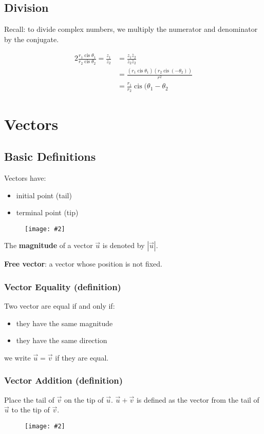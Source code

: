 \documentclass{article}
\newcommand{\diagram}[2][0.5]{
	\begin{figure}[H]
		\centering
		\texttt{[image: \#2]}
	\end{figure}
	}
\DeclareMathOperator\cis{cis}
\theoremstyle{definition}
\numberwithin{equation}{section}
\begin{document}
\subsection{Division}
Recall: to divide complex numbers, we multiply the numerator and denominator by the conjugate.

\begin{alignat*}{2}{}
	\frac{r_1 \cis \theta_1}{r_2 \cis \theta_2} = \frac{z_1}{z_2} &= \frac{z_1 \overline{z}_2}{z_2\overline{z}_2} \\
	&= \frac{(r_1\cis\theta_1)(r_2\cis(-\theta_2))}{r^2} \\
	&= \frac{r_1}{r_2}\cis(\theta_1-\theta_2
\end{alignat*}
\section{Vectors}
\subsection{Basic Definitions}
Vectors have:
\begin{itemize}
	\item initial point (tail)
	\item terminal point (tip)
\end{itemize}
\diagram[0.6]{vector}
The \textbf{magnitude} of a vector $\vec u$ is denoted by $| \vec u |$.

\bigskip \noindent
\textbf{Free vector}: a vector whose position is not fixed.

\subsubsection{Vector Equality (definition)}
Two vector are equal if and only if:
\begin{itemize}
	\item they have the same magnitude
	\item they have the same direction	
\end{itemize}
we write $\vec u = \vec v$ if they are equal.

\subsubsection{Vector Addition (definition)}
Place the tail of $\vec v$ on the tip of $\vec u$. $\vec u + \vec v$ is defined as the vector from the tail of $\vec u$ to the tip of $\vec v$.
\diagram{vector-add}
\end{document}
